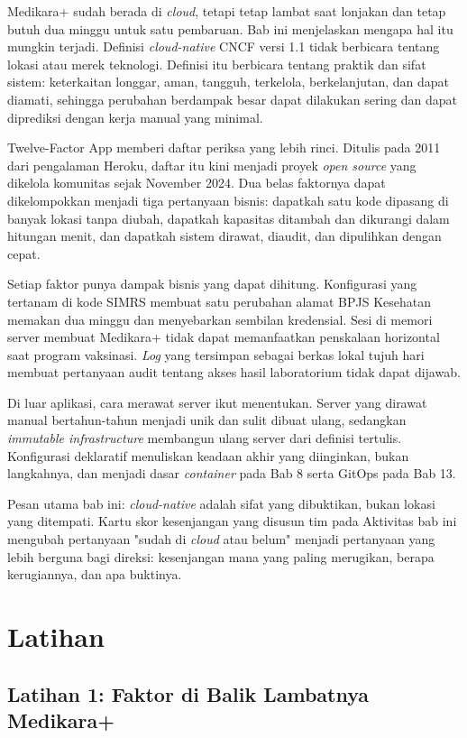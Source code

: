 Medikara+ sudah berada di \textit{cloud}, tetapi tetap lambat saat lonjakan dan tetap butuh
dua minggu untuk satu pembaruan. Bab ini menjelaskan mengapa hal itu mungkin terjadi.
Definisi \textit{cloud-native} CNCF versi 1.1 tidak berbicara tentang lokasi atau merek
teknologi. Definisi itu berbicara tentang praktik dan sifat sistem: keterkaitan longgar,
aman, tangguh, terkelola, berkelanjutan, dan dapat diamati, sehingga perubahan berdampak
besar dapat dilakukan sering dan dapat diprediksi dengan kerja manual yang minimal.

Twelve-Factor App memberi daftar periksa yang lebih rinci. Ditulis pada 2011 dari
pengalaman Heroku, daftar itu kini menjadi proyek \textit{open source} yang dikelola
komunitas sejak November 2024. Dua belas faktornya dapat dikelompokkan menjadi tiga
pertanyaan bisnis: dapatkah satu kode dipasang di banyak lokasi tanpa diubah, dapatkah
kapasitas ditambah dan dikurangi dalam hitungan menit, dan dapatkah sistem dirawat, diaudit,
dan dipulihkan dengan cepat.

Setiap faktor punya dampak bisnis yang dapat dihitung. Konfigurasi yang tertanam di kode
SIMRS membuat satu perubahan alamat BPJS Kesehatan memakan dua minggu dan menyebarkan
sembilan kredensial. Sesi di memori server membuat Medikara+ tidak dapat memanfaatkan
penskalaan horizontal saat program vaksinasi. \textit{Log} yang tersimpan sebagai berkas
lokal tujuh hari membuat pertanyaan audit tentang akses hasil laboratorium tidak dapat
dijawab.

Di luar aplikasi, cara merawat server ikut menentukan. Server yang dirawat manual
bertahun-tahun menjadi unik dan sulit dibuat ulang, sedangkan \textit{immutable
infrastructure} membangun ulang server dari definisi tertulis. Konfigurasi deklaratif
menuliskan keadaan akhir yang diinginkan, bukan langkahnya, dan menjadi dasar
\textit{container} pada Bab 8 serta GitOps pada Bab 13.

Pesan utama bab ini: \textit{cloud-native} adalah sifat yang dibuktikan, bukan lokasi yang
ditempati. Kartu skor kesenjangan yang disusun tim pada Aktivitas bab ini mengubah
pertanyaan "sudah di \textit{cloud} atau belum" menjadi pertanyaan yang lebih berguna bagi
direksi: kesenjangan mana yang paling merugikan, berapa kerugiannya, dan apa buktinya.

\section{Latihan}

\subsection*{Latihan 1: Faktor di Balik Lambatnya Medikara+}

